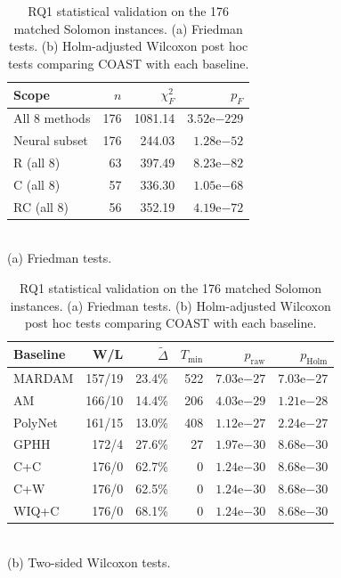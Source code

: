 \documentclass[letterpaper]{article}
\begin{document}
\begin{table}[t]
\caption{RQ1 statistical validation on the 176 matched Solomon instances. (a) Friedman tests. (b) Holm-adjusted Wilcoxon post hoc tests comparing COAST with each baseline.}
\label{tab:rq1_statistics}
\centering
\begin{minipage}[t]{0.5\textwidth}
\centering
{\small
\setlength{\tabcolsep}{3.2pt}
\begin{tabular}{lrrr}
\toprule
Scope & $n$ & $\chi^2_F$ & $p_F$ \\
\midrule
All 8 methods & 176 & 1081.14 & $3.52\mathrm{e}{-229}$ \\
Neural subset & 176 & 244.03 & $1.28\mathrm{e}{-52}$ \\
R (all 8) & 63 & 397.49 & $8.23\mathrm{e}{-82}$ \\
C (all 8) & 57 & 336.30 & $1.05\mathrm{e}{-68}$ \\
RC (all 8) & 56 & 352.19 & $4.19\mathrm{e}{-72}$ \\
\bottomrule
\end{tabular}
}\\[1pt]
\footnotesize (a) Friedman tests.
\end{minipage}\hfill
\begin{minipage}[t]{0.5\textwidth}
\centering
{\small
\setlength{\tabcolsep}{3.0pt}
\begin{tabular}{lrrrrr}
\toprule
Baseline & W/L & $\tilde{\Delta}$ & $T_{\min}$ & $p_{\mathrm{raw}}$ & $p_{\mathrm{Holm}}$ \\
\midrule
MARDAM  & 157/19 & 23.4\% & 522 & $7.03\mathrm{e}{-27}$ & $7.03\mathrm{e}{-27}$ \\
AM      & 166/10 & 14.4\% & 206 & $4.03\mathrm{e}{-29}$ & $1.21\mathrm{e}{-28}$ \\
PolyNet & 161/15 & 13.0\% & 408 & $1.12\mathrm{e}{-27}$ & $2.24\mathrm{e}{-27}$ \\
GPHH    & 172/4  & 27.6\% & 27  & $1.97\mathrm{e}{-30}$ & $8.68\mathrm{e}{-30}$ \\
C+C     & 176/0  & 62.7\% & 0   & $1.24\mathrm{e}{-30}$ & $8.68\mathrm{e}{-30}$ \\
C+W     & 176/0  & 62.5\% & 0   & $1.24\mathrm{e}{-30}$ & $8.68\mathrm{e}{-30}$ \\
WIQ+C   & 176/0  & 68.1\% & 0   & $1.24\mathrm{e}{-30}$ & $8.68\mathrm{e}{-30}$ \\
\bottomrule
\end{tabular}
}\\[1pt]
\footnotesize (b) Two-sided Wilcoxon tests.
\end{minipage}

\end{table}
\end{document}
